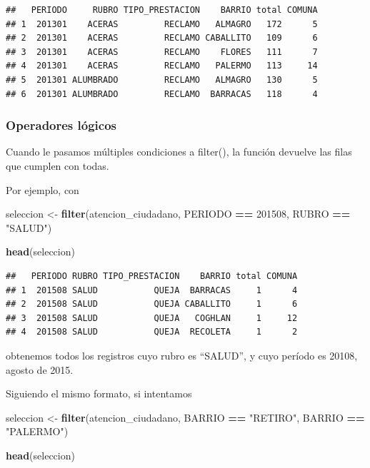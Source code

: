 \documentclass[]{book}
\newenvironment{Shaded}{\begin{snugshade}}{\end{snugshade}}
\newcommand{\KeywordTok}[1]{\textcolor[rgb]{0.13,0.29,0.53}{\textbf{#1}}}
\newcommand{\DecValTok}[1]{\textcolor[rgb]{0.00,0.00,0.81}{#1}}
\newcommand{\StringTok}[1]{\textcolor[rgb]{0.31,0.60,0.02}{#1}}
\newcommand{\OperatorTok}[1]{\textcolor[rgb]{0.81,0.36,0.00}{\textbf{#1}}}
\newcommand{\NormalTok}[1]{#1}
\begin{document}
\begin{verbatim}
##   PERIODO     RUBRO TIPO_PRESTACION    BARRIO total COMUNA
## 1  201301    ACERAS         RECLAMO   ALMAGRO   172      5
## 2  201301    ACERAS         RECLAMO CABALLITO   109      6
## 3  201301    ACERAS         RECLAMO    FLORES   111      7
## 4  201301    ACERAS         RECLAMO   PALERMO   113     14
## 5  201301 ALUMBRADO         RECLAMO   ALMAGRO   130      5
## 6  201301 ALUMBRADO         RECLAMO  BARRACAS   118      4
\end{verbatim}

\subsubsection{Operadores lógicos}\label{operadores-logicos}

Cuando le pasamos múltiples condiciones a filter(), la función devuelve
las filas que cumplen con todas.

Por ejemplo, con

\begin{Shaded}
\begin{Highlighting}[]
\NormalTok{seleccion <-}\StringTok{ }\KeywordTok{filter}\NormalTok{(atencion_ciudadano, PERIODO }\OperatorTok{==}\StringTok{ }\DecValTok{201508}\NormalTok{,  RUBRO }\OperatorTok{==}\StringTok{ "SALUD"}\NormalTok{)}

\KeywordTok{head}\NormalTok{(seleccion)}
\end{Highlighting}
\end{Shaded}

\begin{verbatim}
##   PERIODO RUBRO TIPO_PRESTACION    BARRIO total COMUNA
## 1  201508 SALUD           QUEJA  BARRACAS     1      4
## 2  201508 SALUD           QUEJA CABALLITO     1      6
## 3  201508 SALUD           QUEJA   COGHLAN     1     12
## 4  201508 SALUD           QUEJA  RECOLETA     1      2
\end{verbatim}

obtenemos todos los registros cuyo rubro es ``SALUD'', y cuyo período es
20108, agosto de 2015.

Siguiendo el mismo formato, si intentamos

\begin{Shaded}
\begin{Highlighting}[]
\NormalTok{seleccion <-}\StringTok{ }\KeywordTok{filter}\NormalTok{(atencion_ciudadano, BARRIO }\OperatorTok{==}\StringTok{ "RETIRO"}\NormalTok{, BARRIO }\OperatorTok{==}\StringTok{ "PALERMO"}\NormalTok{)}

\KeywordTok{head}\NormalTok{(seleccion)}
\end{Highlighting}
\end{Shaded}
\end{document}
